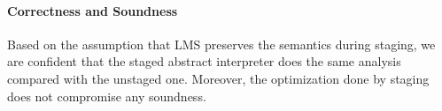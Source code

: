 
\paragraph{Correctness and Soundness}

Based on the assumption that LMS preserves the semantics during staging, we are
confident that the staged abstract interpreter does the same analysis compared
with the unstaged one. Moreover, the optimization done by staging does not
compromise any soundness.

